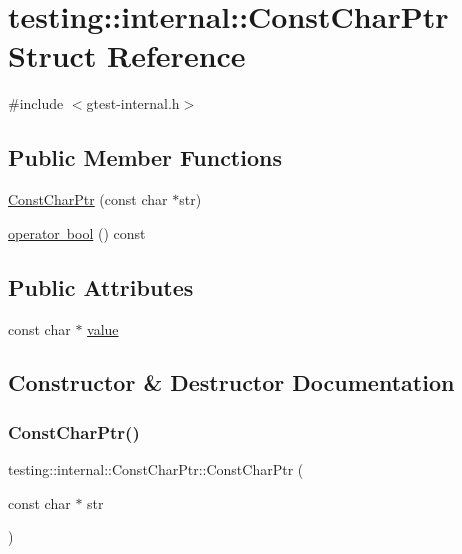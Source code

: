 \hypertarget{structtesting_1_1internal_1_1ConstCharPtr}{}\section{testing\+::internal\+::Const\+Char\+Ptr Struct Reference}
\label{structtesting_1_1internal_1_1ConstCharPtr}


{\ttfamily \#include $<$gtest-\/internal.\+h$>$}

\subsection*{Public Member Functions}
\begin{DoxyCompactItemize}
\item 
\mbox{\hyperlink{structtesting_1_1internal_1_1ConstCharPtr_ae94f6453fa679d815994eccc63062907}{Const\+Char\+Ptr}} (const char $\ast$str)
\item 
\mbox{\hyperlink{structtesting_1_1internal_1_1ConstCharPtr_a85c8174b5d4db8fe96863509ba767b27}{operator bool}} () const
\end{DoxyCompactItemize}
\subsection*{Public Attributes}
\begin{DoxyCompactItemize}
\item 
const char $\ast$ \mbox{\hyperlink{structtesting_1_1internal_1_1ConstCharPtr_adba40d23d5986904b605946f643cf26e}{value}}
\end{DoxyCompactItemize}


\subsection{Constructor \& Destructor Documentation}
\mbox{\label{structtesting_1_1internal_1_1ConstCharPtr_ae94f6453fa679d815994eccc63062907}} 
\subsubsection{\texorpdfstring{ConstCharPtr()}{ConstCharPtr()}}
{\footnotesize\ttfamily testing\+::internal\+::\+Const\+Char\+Ptr\+::\+Const\+Char\+Ptr (\begin{DoxyParamCaption}\item[{const char $\ast$}]{str }\end{DoxyParamCaption})\hspace{0.3cm}{\ttfamily [inline]}}



